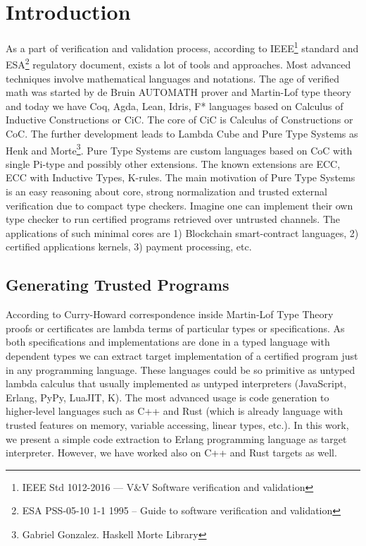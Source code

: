 \documentclass{aip-cp}
\begin{document}
\section{Introduction}
As a part of verification and validation process, according to IEEE\footnote{IEEE Std 1012-2016  --- V\&V Software verification and validation} standard and ESA\footnote{ESA PSS-05-10 1-1 1995 -- Guide to software verification and validation} regulatory document, exists a lot of tools and approaches.
Most advanced techniques involve mathematical languages and notations. 
The age of verified math was started by de Bruin AUTOMATH prover and Martin-Lof\cite{Lof84} type theory and today we have Coq, Agda, Lean, Idris, F* languages based on Calculus of Inductive Constructions or CiC\cite{Mohring15}.
The core of CiC is Calculus of Constructions or CoC\cite{Coq88}.
The further development leads to Lambda Cube\cite{Henk93} and Pure Type Systems as Henk\cite{Erik97} and Morte\footnote{Gabriel Gonzalez. Haskell Morte Library}.
Pure Type Systems are custom languages based on CoC with single Pi-type and possibly other extensions.
The known extensions are ECC, ECC with Inductive Types\cite{Ore92}, K-rules\cite{Barthe95}.
The main motivation of Pure Type Systems is an easy reasoning about core, strong normalization and trusted external verification due to compact type checkers.
Imagine one can implement their own type checker to run certified programs retrieved over untrusted channels.
The applications of such minimal cores are 1) Blockchain smart-contract languages, 2) certified applications kernels, 3) payment processing, etc.

\subsection{Generating Trusted Programs}
According to Curry-Howard correspondence inside Martin-Lof Type Theory\cite{Lof84} proofs or certificates are lambda terms of particular types or specifications.
As both specifications and implementations are done in a typed language with dependent types we can extract target implementation of a certified program just in any programming language.
These languages could be so primitive as untyped lambda calculus that usually implemented as untyped interpreters (JavaScript, Erlang, PyPy, LuaJIT, K).
The most advanced usage is code generation to higher-level languages such as C++ and Rust (which is already language with trusted features on memory, variable accessing, linear types, etc.).
In this work, we present a simple code extraction to Erlang programming language as target interpreter.
However, we have worked also on C++ and Rust targets as well.
\end{document}
